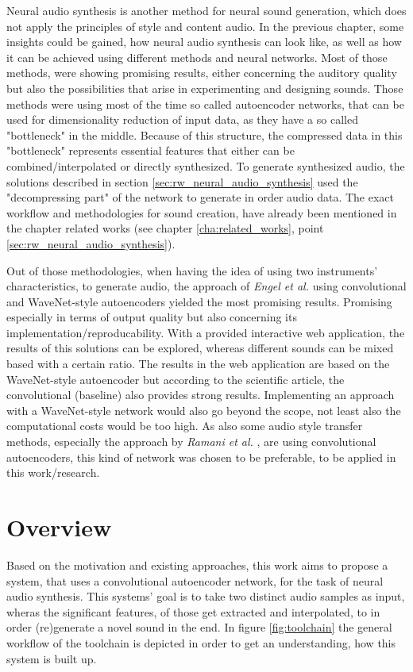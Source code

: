 Neural audio synthesis is another method for neural sound generation, which does not apply the principles of style and content audio. In the previous chapter, some insights could be gained, how neural audio synthesis can look like, as well as how it can be achieved using different methods and neural networks. Most of those methods, were showing promising results, either concerning the auditory quality but also the possibilities that arise in experimenting and designing sounds. Those methods were using most of the time so called autoencoder networks, that can be used for dimensionality reduction of input data, as they have a so called "bottleneck" in the middle. \cite{hinton2006autoencoder} Because of this structure, the compressed data in this "bottleneck" represents essential features that either can be combined/interpolated or directly synthesized. To generate synthesized audio, the solutions described in section \ref{sec:rw_neural_audio_synthesis} used the "decompressing part" of the network to generate in order audio data. The exact workflow and methodologies for sound creation, have already been mentioned in the chapter related works (see chapter \ref{cha:related_works}, point \ref{sec:rw_neural_audio_synthesis}).

Out of those methodologies, when having the idea of using two instruments' characteristics, to generate audio, the approach of \textit{Engel et al.} \cite{Engel2017} using convolutional and WaveNet-style autoencoders yielded the most promising results. Promising especially in terms of output quality but also concerning its implementation/reproducability. With a provided interactive web application, the results of this solutions can be explored, whereas different sounds can be mixed based with a certain ratio. The results in the web application are based on the WaveNet-style autoencoder but according to the scientific article, the convolutional (baseline) also provides strong results. Implementing an approach with a WaveNet-style network would also go beyond the scope, not least also the computational costs would be too high. As also some audio style transfer methods, especially the approach by \textit{Ramani et al.} \cite{Ramani2018}, are using convolutional autoencoders, this kind of network was chosen to be preferable, to be applied in this work/research.

\section{Overview}
\label{sec:app_overview}
Based on the motivation and existing approaches, this work aims to propose a system, that uses a convolutional autoencoder network, for the task of neural audio synthesis. This systems' goal is to take two distinct audio samples as input, wheras the significant features, of those get extracted and interpolated, to in order (re)generate a novel sound in the end. In figure \ref{fig:toolchain} the general workflow of the toolchain is depicted in order to get an understanding, how this system is built up. 

